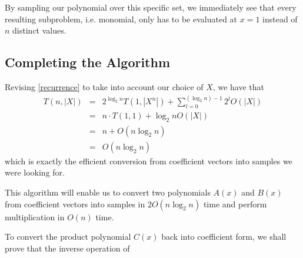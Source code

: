 \documentclass[../article.tex]{subfiles}
\begin{document}
By sampling our polynomial over this specific set, we immediately see that every resulting subproblem, i.e. monomial, only has to be evaluated at $x=1$ instead of $n$ distinct values.

\subsection{Completing the Algorithm}

Revising \eqref{recurrence} to take into account our choice of $X$, we have that
\begin{eqnarray*}
T(n, |X|) &=& 2^{\log_2{n}}T(1,|X^n|)+\sum_{l=0}^{(\log_2{n})-1}2^lO(|X|)\\
&=& n\cdot T(1,1) + \log_2{n}O(|X|)\\
&=& n+O(n\log_2{n})\\
&=& O(n\log_2{n})
\end{eqnarray*}
which is exactly the efficient conversion from coefficient vectors into samples we were looking for.

This algorithm will enable us to convert two polynomials $A(x)$ and $B(x)$ from coefficient vectors into samples in $2O(n\log_2{n})$ time and perform multiplication in $O(n)$ time.

To convert the product polynomial $C(x)$ back into coefficient form, we shall prove that the inverse operation of
\end{document}
